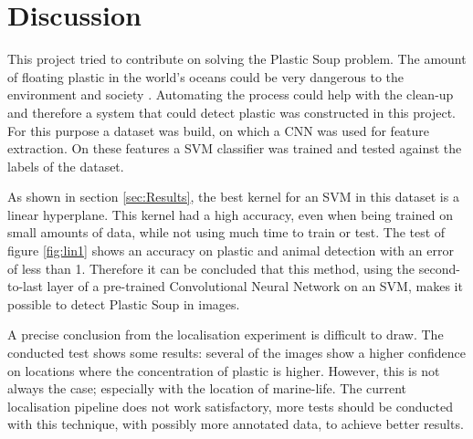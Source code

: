 \section{Discussion}
\label{sec:Discussion}
This project tried to contribute on solving the Plastic Soup problem.
The amount of floating plastic in the world's oceans could be very dangerous to the environment and society \citep{moore2011plastic}.
Automating the process could help with the clean-up and therefore a system that could detect plastic was constructed in this project.
For this purpose a dataset was build, on which a CNN was used for feature extraction.
On these features a SVM classifier was trained and tested against the labels of the dataset.

As shown in section \ref{sec:Results}, the best kernel for an SVM in this dataset is a linear hyperplane. This kernel had a high accuracy, even when being trained on small amounts of data, while not using much time to train or test.
The test of figure \ref{fig:lin1} shows an accuracy on plastic and animal detection with an error of less than 1\permil.
Therefore it can be concluded that this method, using the second-to-last layer of a pre-trained Convolutional Neural Network on an SVM, makes it possible to detect Plastic Soup in images.

A precise conclusion from the localisation experiment is difficult to draw.
The conducted test shows some results: several of the images show a higher confidence on locations where the concentration of plastic is higher.
However, this is not always the case; especially with the location of marine-life.
The current localisation pipeline does not work satisfactory, more tests should be conducted with this technique, with possibly more annotated data, to achieve better results.

